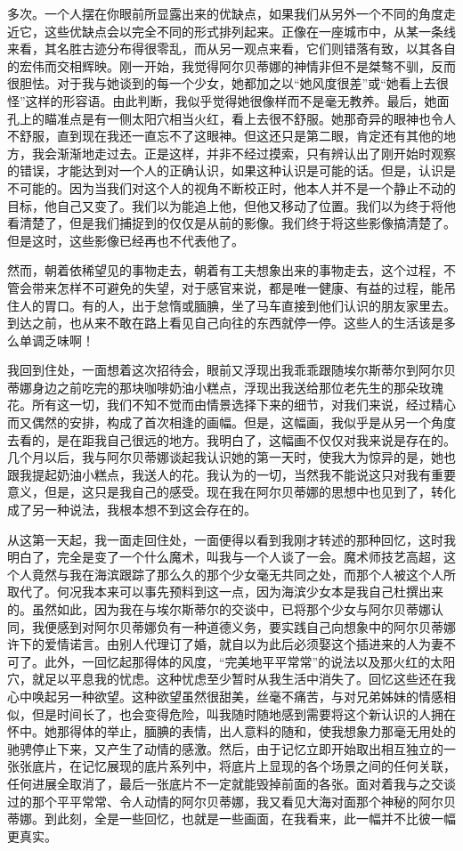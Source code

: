 多次。一个人摆在你眼前所显露出来的优缺点，如果我们从另外一个不同的角度走近它，这些优缺点会以完全不同的形式排列起来。正像在一座城市中，从某一条线来看，其名胜古迹分布得很零乱，而从另一观点来看，它们则错落有致，以其各自的宏伟而交相辉映。刚一开始，我觉得阿尔贝蒂娜的神情非但不是桀骜不驯，反而很胆怯。对于我与她谈到的每一个少女，她都加之以“她风度很差”或“她看上去很怪”这样的形容语。由此判断，我似乎觉得她很像样而不是毫无教养。最后，她面孔上的瞄准点是有一侧太阳穴相当火红，看上去很不舒服。她那奇异的眼神也令人不舒服，直到现在我还一直忘不了这眼神。但这还只是第二眼，肯定还有其他的地方，我会渐渐地走过去。正是这样，并非不经过摸索，只有辨认出了刚开始时观察的错误，才能达到对一个人的正确认识，如果这种认识是可能的话。但是，认识是不可能的。因为当我们对这个人的视角不断校正时，他本人并不是一个静止不动的目标，他自己又变了。我们以为能追上他，但他又移动了位置。我们以为终于将他看清楚了，但是我们捕捉到的仅仅是从前的影像。我们终于将这些影像搞清楚了。但是这时，这些影像已经再也不代表他了。
\par 然而，朝着依稀望见的事物走去，朝着有工夫想象出来的事物走去，这个过程，不管会带来怎样不可避免的失望，对于感官来说，都是唯一健康、有益的过程，能吊住人的胃口。有的人，出于怠惰或腼腆，坐了马车直接到他们认识的朋友家里去。到达之前，也从来不敢在路上看见自己向往的东西就停一停。这些人的生活该是多么单调乏味啊！
\par 我回到住处，一面想着这次招待会，眼前又浮现出我乖乖跟随埃尔斯蒂尔到阿尔贝蒂娜身边之前吃完的那块咖啡奶油小糕点，浮现出我送给那位老先生的那朵玫瑰花。所有这一切，我们不知不觉而由情景选择下来的细节，对我们来说，经过精心而又偶然的安排，构成了首次相逢的画幅。但是，这幅画，我似乎是从另一个角度去看的，是在距我自己很远的地方。我明白了，这幅画不仅仅对我来说是存在的。几个月以后，我与阿尔贝蒂娜谈起我认识她的第一天时，使我大为惊异的是，她也跟我提起奶油小糕点，我送人的花。我认为的一切，当然我不能说这只对我有重要意义，但是，这只是我自己的感受。现在我在阿尔贝蒂娜的思想中也见到了，转化成了另一种说法，我根本想不到这会存在的。
\par 从这第一天起，我一面走回住处，一面便得以看到我刚才转述的那种回忆，这时我明白了，完全是变了一个什么魔术，叫我与一个人谈了一会。魔术师技艺高超，这个人竟然与我在海滨跟踪了那么久的那个少女毫无共同之处，而那个人被这个人所取代了。何况我本来可以事先预料到这一点，因为海滨少女本是我自己杜撰出来的。虽然如此，因为我在与埃尔斯蒂尔的交谈中，已将那个少女与阿尔贝蒂娜认同，我便感到对阿尔贝蒂娜负有一种道德义务，要实践自己向想象中的阿尔贝蒂娜许下的爱情诺言。由别人代理订了婚，就自以为此后必须娶这个插进来的人为妻不可了。此外，一回忆起那得体的风度，“完美地平平常常”的说法以及那火红的太阳穴，就足以平息我的忧虑。这种忧虑至少暂时从我生活中消失了。回忆这些还在我心中唤起另一种欲望。这种欲望虽然很甜美，丝毫不痛苦，与对兄弟姊妹的情感相似，但是时间长了，也会变得危险，叫我随时随地感到需要将这个新认识的人拥在怀中。她那得体的举止，腼腆的表情，出人意料的随和，使我想象力那毫无用处的驰骋停止下来，又产生了动情的感激。然后，由于记忆立即开始取出相互独立的一张张底片，在记忆展现的底片系列中，将底片上显现的各个场景之间的任何关联，任何进展全取消了，最后一张底片不一定就能毁掉前面的各张。面对着我与之交谈过的那个平平常常、令人动情的阿尔贝蒂娜，我又看见大海对面那个神秘的阿尔贝蒂娜。到此刻，全是一些回忆，也就是一些画面，在我看来，此一幅并不比彼一幅更真实。
